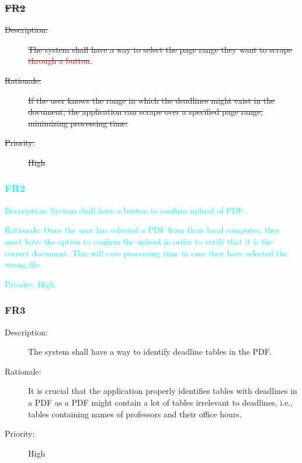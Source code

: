 \documentclass[12pt, titlepage]{article}
\begin{document}
\subsubsection{\sout{FR2}}

\begin{description}
  \item[\sout{Description:}] \sout{The system shall have a way to select the page range they want to scrape \textcolor{red}{through a button}}. 
  \item[\sout{Rationale:}] \sout{If the user knows the range in which the deadlines might exist in the document, the application can scrape over a specified page range, minimizing processing time.}
  \item[\sout{Priority:}] \sout{High}
\end{description}

\subsubsection{\textcolor{cyan}{FR2}}
\begin{description}
	\item \textcolor{cyan}{Description: System shall have a button to confirm upload of PDF.}
	\item \textcolor{cyan}{Rationale: Once the user has selected a PDF from their local computer, they 
  must have the option to confirm the upload in order to verify that it is the correct document. 
  This will save processing time in case they have selected the wrong file.}
	\item \textcolor{cyan}{Priority: High}
\end{description}

\subsubsection{FR3}

\begin{description}
  \item[Description:] The system shall have a way to identify deadline tables in the PDF.
  \item[Rationale:] It is crucial that the application properly identifies tables with deadlines in a PDF as a PDF might contain a lot of tables irrelevant to deadlines, i.e., tables containing names of professors and their office hours. 
  \item[Priority:] High
\end{description}
\end{document}
